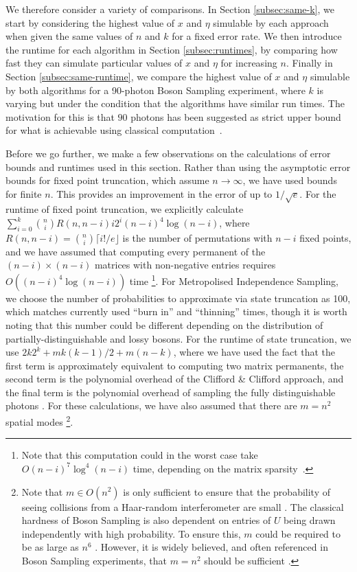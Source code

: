 We therefore consider a variety of comparisons. 
In Section \ref{subsec:same-k}, we start by considering the highest value of $x$ and $\eta$ simulable by each approach when given the same values of $n$ and $k$ for a fixed error rate. 
We then introduce the runtime for each algorithm in Section \ref{subsec:runtimes}, by comparing how fast they can simulate particular values of $x$ and $\eta$ for increasing $n$. 
Finally in Section \ref{subsec:same-runtime}, we compare the highest value of $x$ and $\eta$ simulable by both algorithms for a 90-photon Boson Sampling experiment, where $k$ is varying but under the condition that the algorithms have similar run times. The motivation for this is that $90$ photons has been suggested as strict upper bound for what is achievable using classical computation~\cite{dalzell2018}.

Before we go further, we make a few observations on the calculations of error bounds and runtimes used in this section. 
Rather than using the asymptotic error bounds for fixed point truncation, which assume $n\rightarrow\infty$, we have used bounds for finite $n$. 
This provides an improvement in the error of up to $1/\sqrt{e}$. 
For the runtime of fixed point truncation, we explicitly calculate $\sum_{i=0}^k\binom{n}{i}R(n,n-i)i2^i(n-i)^4\log(n-i)$, where $R(n,n-i)=\binom{n}{i}\lceil i!/e\rfloor$ is the number of permutations with $n-i$ fixed points, and we have assumed that computing every permanent of the $(n-i)\times(n-i)$ matrices with non-negative entries requires $O((n-i)^4\log(n-i))$ time
\footnote{Note that this computation could in the worst case take $O(n-i)^7\log^4(n-i)$ time, depending on the matrix sparsity~\cite{huber2008}.}. 
For Metropolised Independence Sampling, we choose the number of probabilities to approximate via state truncation as 100, which matches currently used ``burn in'' and ``thinning'' times\cite{neville2017}, though it is worth noting that this number could be different depending on the distribution of partially-distinguishable and lossy bosons. 
For the runtime of state truncation, we use $2k2^k + mk(k-1)/2 + m(n-k)$, where we have used the fact that the first term is approximately equivalent to computing two matrix permanents, the second term is the polynomial overhead of the Clifford \& Clifford approach, and the final term is the polynomial overhead of sampling the fully distinguishable photons \cite{clifford2017}. 
For these calculations, we have also assumed that there are $m=n^2$ spatial modes
\footnote{Note that $m\in O(n^2)$ is only sufficient to ensure that the probability of seeing collisions from a Haar-random interferometer are small \cite{arkhipov2011}. 
The classical hardness of Boson Sampling is also dependent on entries of $U$ being drawn independently with high probability. 
To ensure this, $m$ could be required to be as large as $n^6$ \cite{aaronson2011}. 
However, it is widely believed, and often referenced in Boson Sampling experiments, that $m=n^2$ should be sufficient \cite{aaronson2011,broome2013, spring2013, tillmann2013, crespi2013,carolan2015,wang2017,zhong2018}.}.

